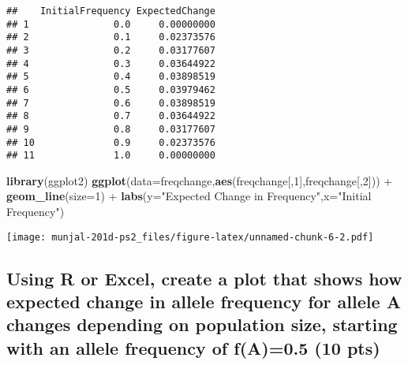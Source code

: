 \documentclass[]{article}
\newenvironment{Shaded}{\begin{snugshade}}{\end{snugshade}}
\newcommand{\KeywordTok}[1]{\textcolor[rgb]{0.13,0.29,0.53}{\textbf{{#1}}}}
\newcommand{\DataTypeTok}[1]{\textcolor[rgb]{0.13,0.29,0.53}{{#1}}}
\newcommand{\DecValTok}[1]{\textcolor[rgb]{0.00,0.00,0.81}{{#1}}}
\newcommand{\StringTok}[1]{\textcolor[rgb]{0.31,0.60,0.02}{{#1}}}
\newcommand{\NormalTok}[1]{{#1}}
\begin{document}
\begin{verbatim}
##    InitialFrequency ExpectedChange
## 1               0.0     0.00000000
## 2               0.1     0.02373576
## 3               0.2     0.03177607
## 4               0.3     0.03644922
## 5               0.4     0.03898519
## 6               0.5     0.03979462
## 7               0.6     0.03898519
## 8               0.7     0.03644922
## 9               0.8     0.03177607
## 10              0.9     0.02373576
## 11              1.0     0.00000000
\end{verbatim}

\begin{Shaded}
\begin{Highlighting}[]
\KeywordTok{library}\NormalTok{(ggplot2)}
\KeywordTok{ggplot}\NormalTok{(}\DataTypeTok{data=}\NormalTok{freqchange,}\KeywordTok{aes}\NormalTok{(freqchange[,}\DecValTok{1}\NormalTok{],freqchange[,}\DecValTok{2}\NormalTok{])) +}\StringTok{ }
\StringTok{        }\KeywordTok{geom_line}\NormalTok{(}\DataTypeTok{size=}\DecValTok{1}\NormalTok{) +}\StringTok{ }
\StringTok{        }\KeywordTok{labs}\NormalTok{(}\DataTypeTok{y=}\StringTok{"Expected Change in Frequency"}\NormalTok{,}\DataTypeTok{x=}\StringTok{"Initial Frequency"}\NormalTok{)}
\end{Highlighting}
\end{Shaded}

\texttt{[image: munjal-201d-ps2\_files/figure-latex/unnamed-chunk-6-2.pdf]}

\subsection{Using R or Excel, create a plot that shows how expected
change in allele frequency for allele A changes depending on population
size, starting with an allele frequency of f(A)=0.5 (10
pts)}\label{using-r-or-excel-create-a-plot-that-shows-how-expected-change-in-allele-frequency-for-allele-a-changes-depending-on-population-size-starting-with-an-allele-frequency-of-fa0.5-10-pts}
\end{document}
